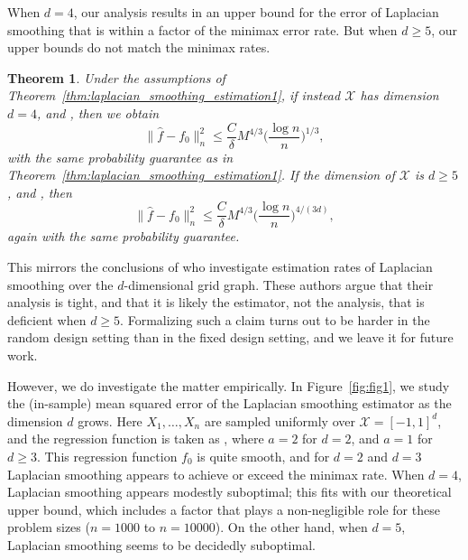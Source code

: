 \documentclass[twoside]{article}
\newcommand{\1}{\mathbf{1}}
\newcommand{\Xset}{\mathcal{X}}
\newcommand{\wh}[1]{\widehat{#1}}
\newtheorem{theorem}{Theorem}
\theoremstyle{definition}
\theoremstyle{remark}
\begin{document}
When $d = 4$, our analysis results in an upper bound for the error of Laplacian smoothing that is within a  factor of the minimax error rate. But when $d \geq 5$, our upper bounds do not match the minimax rates.
\begin{theorem}
	\label{thm:laplacian_smoothing_estimation2}
	Under the assumptions of Theorem~\ref{thm:laplacian_smoothing_estimation1}, if instead $\Xset$ has dimension $d = 4$,  and , then we obtain 
	\begin{equation*}
	\bigl\|\wh{f} - f_0\bigr\|_n^2 \leq \frac{C}{\delta} M^{4/3} \biggl(\frac{\log n}{n}\biggr)^{1/3},
	\end{equation*}
	with the same probability guarantee as in Theorem~\ref{thm:laplacian_smoothing_estimation1}. If the dimension of $\Xset$ is $d \geq 5$,  and , then
	\begin{equation*}
	\bigl\|\wh{f} - f_0\bigr\|_n^2 \leq \frac{C}{\delta} M^{4/3} \biggl(\frac{\log n}{n}\biggr)^{4/(3d)},
	\end{equation*}
	again with the same probability guarantee.
\end{theorem}
This mirrors the conclusions of \citet{sadhanala16} who investigate estimation rates of Laplacian smoothing over the $d$-dimensional grid graph. These authors argue that their analysis is tight, and that it is likely the estimator, not the analysis, that is deficient when $d \geq 5$. Formalizing such a claim turns out to be harder in the random design setting than in the fixed design setting, and we leave it for future work. 

However, we do investigate the matter empirically. In Figure~\ref{fig:fig1}, we study the (in-sample) mean squared error of the Laplacian smoothing estimator as the dimension $d$ grows. Here $X_1,\ldots,X_n$ are sampled uniformly over $\Xset = [-1,1]^d$, and the regression function is taken as , where $a = 2$ for $d = 2$, and $a = 1$ for $d \geq 3$. This regression function $f_0$ is quite smooth, and for $d = 2$ and $d = 3$ Laplacian smoothing appears to achieve or exceed the minimax rate. When $d = 4$, Laplacian smoothing appears modestly suboptimal; this fits with our theoretical upper bound, which includes a  factor that plays a non-negligible role for these problem sizes ($n=1000$ to $n=10000$). On the other hand, when $d = 5$, Laplacian smoothing seems to be decidedly suboptimal. 
\end{document}
